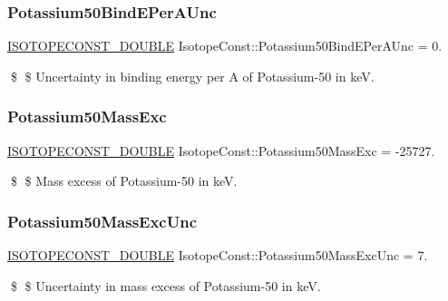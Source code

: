 \subsubsection{\texorpdfstring{Potassium50\+Bind\+E\+Per\+A\+Unc}{Potassium50BindEPerAUnc}}
{\footnotesize\ttfamily \mbox{\hyperlink{group___isotope_const-_macros_ga8f45a7272ce02c0b4c65c44636ed719a}{I\+S\+O\+T\+O\+P\+E\+C\+O\+N\+S\+T\+\_\+\+D\+O\+U\+B\+LE}} Isotope\+Const\+::\+Potassium50\+Bind\+E\+Per\+A\+Unc = 0.}

\$ \$ Uncertainty in binding energy per A of Potassium-\/50 in keV. \mbox{\label{group___isotope_const-_potassium-_k50_ga372a3ee2d06da4d4e39d75db1782404d}} 
\subsubsection{\texorpdfstring{Potassium50\+Mass\+Exc}{Potassium50MassExc}}
{\footnotesize\ttfamily \mbox{\hyperlink{group___isotope_const-_macros_ga8f45a7272ce02c0b4c65c44636ed719a}{I\+S\+O\+T\+O\+P\+E\+C\+O\+N\+S\+T\+\_\+\+D\+O\+U\+B\+LE}} Isotope\+Const\+::\+Potassium50\+Mass\+Exc = -\/25727.}

\$ \$ Mass excess of Potassium-\/50 in keV. \mbox{\label{group___isotope_const-_potassium-_k50_gae91d4b3a40a120b0e11cc9e3b1e938c0}} 
\subsubsection{\texorpdfstring{Potassium50\+Mass\+Exc\+Unc}{Potassium50MassExcUnc}}
{\footnotesize\ttfamily \mbox{\hyperlink{group___isotope_const-_macros_ga8f45a7272ce02c0b4c65c44636ed719a}{I\+S\+O\+T\+O\+P\+E\+C\+O\+N\+S\+T\+\_\+\+D\+O\+U\+B\+LE}} Isotope\+Const\+::\+Potassium50\+Mass\+Exc\+Unc = 7.}

\$ \$ Uncertainty in mass excess of Potassium-\/50 in keV. \mbox{\label{group___isotope_const-_potassium-_k50_ga9d3f7b3ce6a3a080d549aa4d14bf090b}} 
